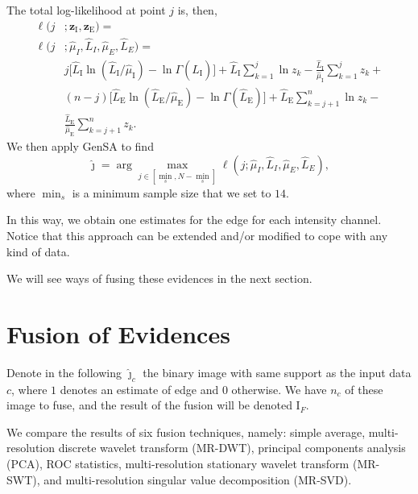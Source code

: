 \documentclass[journal]{IEEEtran}
\begin{document}
The total log-likelihood at point $j$ is, then,
\begin{equation}\label{eq:TotalLogLikelihood}
\begin{split}
\ell(j&;\bm z_\text{I},\bm z_\text{E}) = \\
\ell(j&;\widehat{\mu}_I, \widehat{L}_I,\widehat{\mu}_E, \widehat{L}_E)=\\
&j \big[\widehat{L}_\text{I}\ln (\widehat{L}_\text{I} / \widehat{\mu}_\text{I}) - \ln \Gamma(\widehat{L}_\text{I})\big]
+\widehat{L}_\text{I} \sum_{k=1}^{j}\ln z_k -\frac{\widehat{L}_\text{I}}{\widehat{\mu}_\text{I}}\sum_{k=1}^{j} z_k +\\
&(n-j) \big[\widehat{L}_\text{E}\ln (\widehat{L}_\text{E} / \widehat{\mu}_\text{E}) - \ln \Gamma(\widehat{L}_\text{E})\big]
+\widehat{L}_\text{E} \sum_{k=j+1}^{n}\ln z_k -\\ &\frac{\widehat{L}_\text{E}}{\widehat{\mu}_\text{E}}\sum_{k=j+1}^{n} z_k.
\end{split}
\end{equation}
We then apply GenSA to find  
$$
\widehat{\jmath}= \arg\max\limits_{j\in [\min_s,N-\min_s]}\ell(j;\widehat{\mu}_I, \widehat{L}_I,\widehat{\mu}_E, \widehat{L}_E),
$$ 
where $\min_s$ is a minimum sample size that we set to $14$.

In this way, we obtain one estimates for the edge for each intensity channel.
Notice that this approach can be extended and/or modified to cope with any kind of data.

We will see ways of fusing these evidences in the next section.

\section{Fusion of Evidences}\label{sec_04}

Denote in the following $\widehat{\bm\jmath}_c$ the binary image with same support as the input data $c$, where $1$ denotes an estimate of edge and $0$ otherwise.
We have $n_c$ of these image to fuse, and the result of the fusion will be denoted $\text{I}_F$.

We compare the results of six fusion techniques, namely:
simple average, 
multi-resolution discrete wavelet transform (MR-DWT),
principal components analysis (PCA), 
ROC statistics,
multi-resolution stationary wavelet transform (MR-SWT), and
multi-resolution singular value decomposition (MR-SVD).

\end{document}
